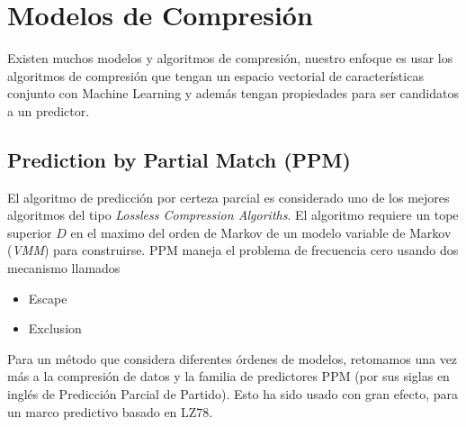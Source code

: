 




\vspace{2cm}
\section{Modelos de Compresión}


Existen muchos modelos y algoritmos de compresión, nuestro enfoque es usar los algoritmos de compresión que tengan un espacio vectorial de características conjunto con Machine Learning y además tengan propiedades para ser candidatos a un predictor. 







 
 \subsection{Prediction by Partial Match (PPM)}
 
	El algoritmo de predicción por certeza parcial es considerado uno de los mejores algoritmos del tipo \emph{Lossless Compression Algoriths}. El algoritmo requiere un tope superior $D$ en el maximo del orden de Markov de un modelo variable de Markov (\emph{VMM}) para construirse. 
	PPM maneja el problema de frecuencia cero usando dos mecanismo  llamados
	
	\begin{itemize}
			\setlength{\itemsep}{1pt}
			\setlength{\parskip}{0pt}
			\setlength{\parsep}{0pt}
		\item Escape
		\item Exclusion
	\end{itemize}
	
Para un método que considera diferentes órdenes de modelos, retomamos una vez más a la compresión de datos y la familia de predictores PPM  (por sus siglas en inglés de Predicción Parcial de Partido). Esto ha sido usado con gran efecto, para un marco predictivo basado en LZ78. 


